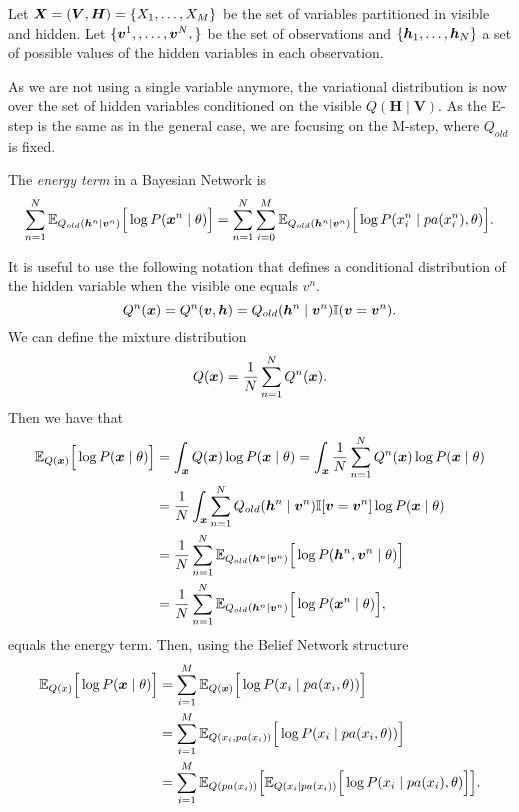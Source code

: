 
Let \(\bm{X} = (\bm{V}, \bm{H}) = \{X_{1}, \dots , X_{M}\}\) be the set of variables partitioned in visible and hidden. Let \(\{\bm{v}^{1},,\dots,\bm{v}^{N},\}\) be the set of observations and \( \{\bm{h}_1,\dots, \bm{h}_N\} \) a set of possible values of the hidden variables in each observation.

As we are not using a single variable anymore, the variational distribution is now over the set of hidden variables conditioned on the visible \(Q(\bm{H} \mid \bm{V})\). As the E-step is the same as in the general case, we are focusing on the M-step, where \(Q_{old}\) is fixed.

The \emph{energy term} in a Bayesian Network is
\[
  \sum_{n=1}^{N} \mathbb{E}_{Q_{old}(\bm{h}^{n} \mid \bm{v}^{n})}\Big[ \log{P(\bm{x}^{n} \mid \theta)} \Big] = \sum_{n = 1}^{N}\sum_{i = 0}^{M} \mathbb{E}_{Q_{old}(\bm{h}^{n} \mid \bm{v}^{n})}\Big[\log{P( x_{i}^{n} \mid pa(x_{i}^{n}), \theta)}\Big].
\]

It is useful to use the following notation that defines a conditional distribution of the hidden variable when the visible one equals \(v^{n}\).
\[
  Q^{n}(\bm{x}) = Q^{n}(\bm{v},\bm{h}) = Q_{old}(\bm{h}^{n} \mid \bm{v}^{n}) \mathbb{I}(\bm{v} = \bm{v}^{n}).
\]
We can define the mixture distribution
\[
  Q(\bm{x}) = \frac{1}{N}\sum_{n = 1}^{N}Q^{n}(\bm{x}).
\]
Then we have that
\[
  \begin{aligned}
    \mathbb{E}_{Q(\bm{x})}\Big[\log{P(\bm{x}\mid \theta)}\Big] &= \int_{\bm{x}}Q(\bm{x})\log{P(\bm{x}\mid \theta)} =  \int_{\bm{x}} \frac{1}{N}\sum_{n=1}^{N}Q^{n}(\bm{x})\log{P(\bm{x}\mid \theta)} \\
    &= \frac{1}{N} \int_{\bm{x}}\sum_{n=1}^{N}Q_{old}(\bm{h}^n \mid \bm{v}^{n})\mathbb{I}[\bm{v} = \bm{v}^{n}]\log{P(\bm{x}\mid \theta)}\\
    &= \frac{1}{N}\sum_{n = 1}^{N}\mathbb{E}_{Q_{old}(\bm{h}^n \mid \bm{v}^{n})}\Big[\log{P(\bm{h}^n, \bm{v}^{n} \mid \theta)}\Big]\\
    &= \frac{1}{N}\sum_{n = 1}^{N}\mathbb{E}_{Q_{old}(\bm{h}^n \mid \bm{v}^{n})}\Big[\log{P(\bm{x}^{n} \mid \theta)}\Big],
  \end{aligned}
\]
equals the energy term. Then, using the Belief Network structure
\[
  \begin{aligned}
    \mathbb{E}_{Q(x)}\Big[\log{P(\bm{x}\mid \theta)}\Big] &= \sum_{i = 1}^{M}\mathbb{E}_{Q(\bm{x})}\Big[\log{P(x_{i} \mid pa(x_{i}, \theta))}\Big]\\
    &= \sum_{i = 1}^{M}\mathbb{E}_{Q(x_{i}, pa(x_{i}))}\Big[\log{P(x_{i} \mid pa(x_{i}, \theta))}\Big]\\
    &= \sum_{i = 1}^{M}\mathbb{E}_{Q(pa(x_{i}))}\Big[ \mathbb{E}_{Q(x_{i}\mid pa(x_{i}))}\Big[ \log{P(x_{i} \mid pa(x_{i}), \theta)}\Big]\Big].
\end{aligned}
\]

